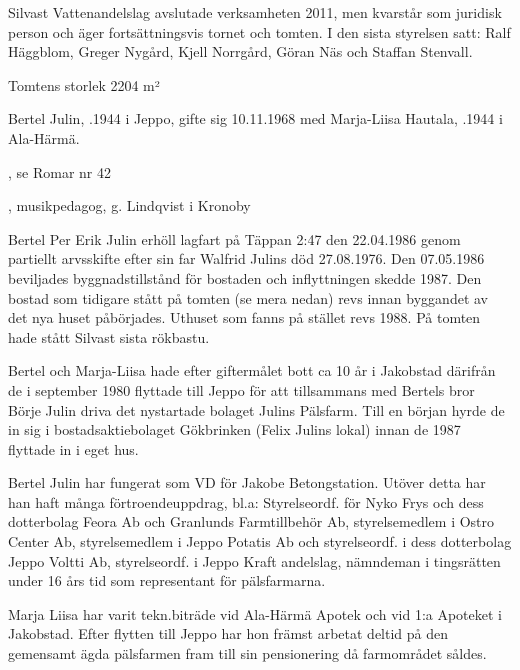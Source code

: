 Silvast Vattenandelslag avslutade verksamheten 2011, men kvarstår som juridisk person och äger fortsättningsvis tornet och tomten. I den sista styrelsen satt: Ralf Häggblom, Greger Nygård, Kjell Norrgård, Göran Näs och Staffan Stenvall.



%
 Tomtens storlek 2204 m²



%
Bertel Julin, .1944 i Jeppo, gifte sig 10.11.1968 med Marja-Liisa Hautala, .1944 i Ala-Härmä.
\begin{jhchildren}
  \item {}, se Romar nr 42
  \item {}, musikpedagog, g. Lindqvist i Kronoby
\end{jhchildren}
Bertel Per Erik Julin erhöll lagfart på Täppan 2:47 den 22.04.1986 genom partiellt arvsskifte efter sin far Walfrid Julins död 27.08.1976. Den 07.05.1986 beviljades byggnadstillstånd för bostaden och inflyttningen skedde 1987. Den bostad som tidigare stått på tomten (se mera nedan) revs innan byggandet av det nya huset påbörjades. Uthuset som fanns på stället revs 1988. På tomten hade stått Silvast sista rökbastu.

Bertel och Marja-Liisa hade efter giftermålet bott ca 10 år i Jakobstad därifrån de i september 1980 flyttade till Jeppo för att tillsammans med Bertels bror Börje Julin driva det nystartade bolaget Julins Pälsfarm. Till en början hyrde de in sig i bostadsaktiebolaget Gökbrinken (Felix Julins lokal) innan de 1987 flyttade in i eget hus.

Bertel Julin har fungerat som VD för Jakobe Betongstation. Utöver detta har han haft många förtroendeuppdrag, bl.a: Styrelseordf. för Nyko Frys och dess dotterbolag Feora Ab och Granlunds Farmtillbehör Ab, styrelsemedlem i Ostro Center Ab, styrelsemedlem i Jeppo Potatis Ab och styrelseordf. i dess dotterbolag Jeppo Voltti Ab, styrelseordf. i Jeppo Kraft andelslag, nämndeman i tingsrätten under 16 års tid som representant för pälsfarmarna.

Marja Liisa har varit tekn.biträde vid Ala-Härmä Apotek och vid 1:a Apoteket i Jakobstad. Efter flytten till Jeppo har hon främst arbetat deltid på den gemensamt ägda pälsfarmen fram till sin pensionering då farmområdet såldes.


